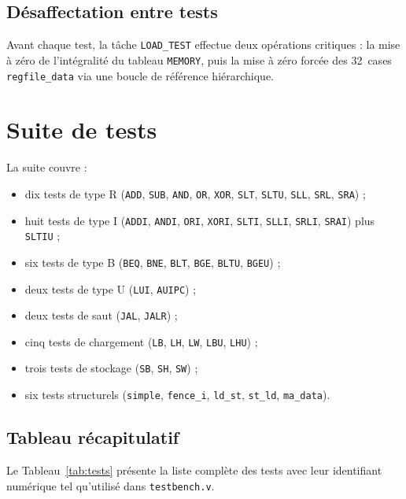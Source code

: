 \documentclass[11pt,a4paper,oneside]{report}
\begin{document}
\subsection{Désaffectation entre tests}
Avant chaque test, la tâche \texttt{LOAD\_TEST} effectue deux
opérations critiques : la mise à zéro de l'intégralité du
tableau \texttt{MEMORY}, puis la mise à zéro forcée des 32~cases
\texttt{regfile\_data} via une boucle de référence hiérarchique.


\section{Suite de tests}
La suite couvre :
\begin{itemize}
  \item dix tests de type R (\texttt{ADD}, \texttt{SUB},
        \texttt{AND}, \texttt{OR}, \texttt{XOR},
        \texttt{SLT}, \texttt{SLTU}, \texttt{SLL}, \texttt{SRL},
        \texttt{SRA}) ;
  \item huit tests de type I (\texttt{ADDI}, \texttt{ANDI},
        \texttt{ORI}, \texttt{XORI}, \texttt{SLTI},
        \texttt{SLLI}, \texttt{SRLI}, \texttt{SRAI}) plus
        \texttt{SLTIU} ;
  \item six tests de type B (\texttt{BEQ}, \texttt{BNE},
        \texttt{BLT}, \texttt{BGE}, \texttt{BLTU},
        \texttt{BGEU}) ;
  \item deux tests de type U (\texttt{LUI}, \texttt{AUIPC}) ;
  \item deux tests de saut (\texttt{JAL}, \texttt{JALR}) ;
  \item cinq tests de chargement (\texttt{LB}, \texttt{LH},
        \texttt{LW}, \texttt{LBU}, \texttt{LHU}) ;
  \item trois tests de stockage (\texttt{SB}, \texttt{SH},
        \texttt{SW}) ;
  \item six tests structurels (\texttt{simple},
        \texttt{fence\_i}, \texttt{ld\_st}, \texttt{st\_ld},
        \texttt{ma\_data}).
\end{itemize}

\subsection{Tableau récapitulatif}
Le Tableau~\ref{tab:tests} présente la liste complète des tests avec leur
identifiant numérique tel qu'utilisé dans \texttt{testbench.v}.
\end{document}
